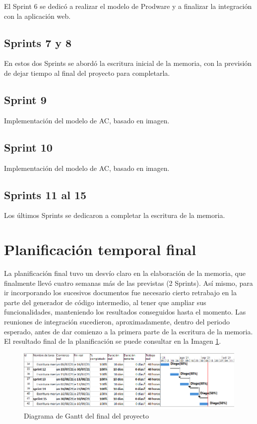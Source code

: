 El Sprint 6 se dedicó a realizar el modelo de Prodware y a finalizar la integración con la aplicación web.

\subsection{Sprints 7 y 8}

En estos dos Sprints se abordó la escritura inicial de la memoria, con la previsión de dejar tiempo al final del proyecto para completarla.

\subsection{Sprint 9}

Implementación del modelo de AC, basado en imagen.

\subsection{Sprint 10}

Implementación del modelo de AC, basado en imagen.

\subsection{Sprints 11 al 15}

Los últimos Sprints se dedicaron a completar la escritura de la memoria.

\section{Planificación temporal final}

La planificación final tuvo un desvío claro en la elaboración de la memoria, que finalmente llevó cuatro semanas más de las previstas (2 Sprints). Así mismo, para ir incorporando los sucesivos documentos fue necesario cierto retrabajo en la parte del generador de código intermedio, al tener que ampliar sus funcionalidades, manteniendo los resultados conseguidos hasta el momento. Las reuniones de integración sucedieron, aproximadamente, dentro del periodo esperado, antes de dar comienzo a la primera parte de la escritura de la memoria. El resultado final de la planificación se puede consultar en la Imagen \ref{fig:gantt-final}.

\begin{figure}[hp!]
	\centering
	\includegraphics[angle=0,width=1.0\textwidth]{imaxes/f-planificacion/gantt-final}
	\caption{Diagrama de Gantt del final del proyecto}
	\label{fig:gantt-final}
\end{figure}

